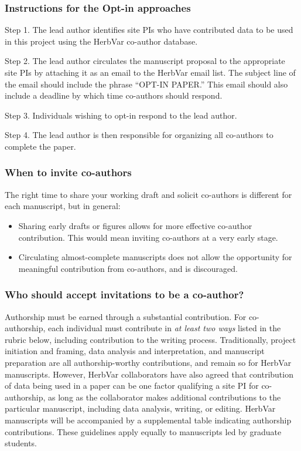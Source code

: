 \documentclass[
  letterpaper,
  oneside,
  open=any]{scrbook}
\begin{document}
\subsubsection{Instructions for the Opt-in
approaches}\label{instructions-for-the-opt-in-approaches}

Step 1. The lead author identifies site PIs who have contributed data to
be used in this project using the HerbVar co-author database.

Step 2. The lead author circulates the manuscript proposal to the
appropriate site PIs by attaching it as an email to the HerbVar email
list. The subject line of the email should include the phrase ``OPT-IN
PAPER.'' This email should also include a deadline by which time
co-authors should respond.

Step 3. Individuals wishing to opt-in respond to the lead author.

Step 4. The lead author is then responsible for organizing all
co-authors to complete the paper.

\subsubsection{When to invite
co-authors}\label{when-to-invite-co-authors}

The right time to share your working draft and solicit co-authors is
different for each manuscript, but in general:

\begin{itemize}
\item
  Sharing early drafts or figures allows for more effective co-author
  contribution. This would mean inviting co-authors at a very early
  stage.
\item
  Circulating almost-complete manuscripts does not allow the opportunity
  for meaningful contribution from co-authors, and is discouraged.
\end{itemize}

\subsubsection{Who should accept invitations to be a
co-author?}\label{who-should-accept-invitations-to-be-a-co-author}

Authorship must be earned through a substantial contribution. For
co-authorship, each individual must contribute in \emph{at least two
ways} listed in the rubric below, including contribution to the writing
process. Traditionally, project initiation and framing, data analysis
and interpretation, and manuscript preparation are all authorship-worthy
contributions, and remain so for HerbVar manuscripts. However, HerbVar
collaborators have also agreed that contribution of data being used in a
paper can be one factor qualifying a site PI for co-authorship, as long
as the collaborator makes additional contributions to the particular
manuscript, including data analysis, writing, or editing. HerbVar
manuscripts will be accompanied by a supplemental table indicating
authorship contributions. These guidelines apply equally to manuscripts
led by graduate students.
\end{document}
